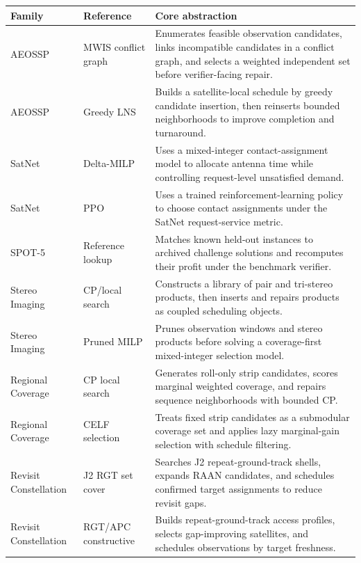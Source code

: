 \documentclass[11pt]{article}
\begin{document}
\begin{table}[!t]
\centering
\scriptsize
\setlength{\tabcolsep}{3pt}
\renewcommand{\arraystretch}{1.12}
\begin{tabular}{>{\raggedright\arraybackslash}p{}>{\raggedright\arraybackslash}p{}>{\raggedright\arraybackslash}p{}}
\hline
\textbf{Family} & \textbf{Reference} & \textbf{Core abstraction} \\
\hline
AEOSSP & MWIS conflict graph & Enumerates feasible observation candidates, links incompatible candidates in a conflict graph, and selects a weighted independent set before verifier-facing repair. \\
AEOSSP & Greedy LNS & Builds a satellite-local schedule by greedy candidate insertion, then reinserts bounded neighborhoods to improve completion and turnaround. \\
SatNet & Delta-MILP & Uses a mixed-integer contact-assignment model to allocate antenna time while controlling request-level unsatisfied demand. \\
SatNet & PPO & Uses a trained reinforcement-learning policy to choose contact assignments under the SatNet request-service metric. \\
SPOT-5 & Reference lookup & Matches known held-out instances to archived challenge solutions and recomputes their profit under the benchmark verifier. \\
Stereo Imaging & CP/local search & Constructs a library of pair and tri-stereo products, then inserts and repairs products as coupled scheduling objects. \\
Stereo Imaging & Pruned MILP & Prunes observation windows and stereo products before solving a coverage-first mixed-integer selection model. \\
Regional Coverage & CP local search & Generates roll-only strip candidates, scores marginal weighted coverage, and repairs sequence neighborhoods with bounded CP. \\
Regional Coverage & CELF selection & Treats fixed strip candidates as a submodular coverage set and applies lazy marginal-gain selection with schedule filtering. \\
Revisit Constellation & J2 RGT set cover & Searches J2 repeat-ground-track shells, expands RAAN candidates, and schedules confirmed target assignments to reduce revisit gaps. \\
Revisit Constellation & RGT/APC constructive & Builds repeat-ground-track access profiles, selects gap-improving satellites, and schedules observations by target freshness. \\

\end{tabular}
\end{table}
\end{document}
